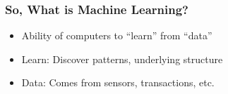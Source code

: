 

\begin{frame}[fragile]\frametitle{So, What is Machine Learning?}
\begin{itemize}
\item Ability of computers to ``learn'' from ``data''
\item Learn: Discover patterns, underlying structure  
\item Data: Comes from sensors, transactions, etc.
\end{itemize}
\end{frame}





